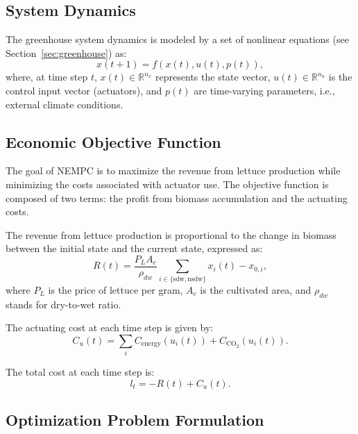 \documentclass[conference]{IEEEtran}
\newcommand{\coo}{\ensuremath{\mathrm{CO_2}}}
\begin{document}
\subsection{System Dynamics}\label{subsec:mpc_dynamics}

The greenhouse system dynamics is modeled by a set of nonlinear equations (see Section~\ref{sec:greenhouse}) as:
\begin{equation}
    x(t+1) = f\left( x(t), u(t), p(t) \right),
\end{equation}
where, at time step \(t\), \(x(t) \in \mathbb{R}^{n_x}\) represents the state vector, \(u(t) \in \mathbb{R}^{n_u}\) is the control input vector (actuators), and \(p(t)\) are time-varying parameters, i.e., external climate conditions.

\subsection{Economic Objective Function}\label{subsec:mpc_objective}

The goal of NEMPC is to maximize the revenue from lettuce production while minimizing the costs associated with actuator use. The objective function is composed of two terms: the profit from biomass accumulation and the actuating costs.

The revenue from lettuce production is proportional to the change in biomass between the initial state and the current state, expressed as:
\begin{equation}
    R(t) = \frac{P_L A_c}{\rho_{dw}} \textstyle\sum_{i\in \{ \text{sdw}, \text{nsdw} \}}x_i(t) - x_{0, i},
\end{equation}
where \(P_L\) is the price of lettuce per gram, \(A_c\) is the cultivated area, and \(\rho_{dw}\) stands for dry-to-wet ratio.

The actuating cost at each time step is given by:
\begin{equation}
    C_u(t) = \textstyle\sum_{i} C_{\text{energy}}(u_i(t)) + C_{\coo}(u_i(t)).
\end{equation}

The total cost at each time step is:
\begin{equation}
    l_t = -R(t) + C_u(t).
\end{equation}

\subsection{Optimization Problem Formulation}
\end{document}
